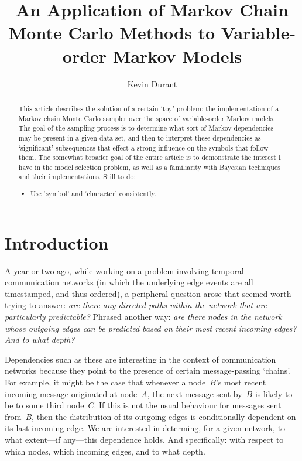 \documentclass[12pt,a4paper]{article}
\title{An Application of Markov Chain Monte Carlo Methods to Variable-order
  Markov Models}
\author{Kevin Durant}
\date{}
\begin{document}
\maketitle

\begin{abstract}
This article describes the solution of a certain `toy' problem: the
implementation of a Markov chain Monte Carlo sampler over the space of
variable-order Markov models. The goal of the sampling process is to determine
what sort of Markov dependencies may be present in a given data set, and then to
interpret these dependencies as `significant' subsequences that effect a strong
influence on the symbols that follow them. The somewhat broader goal of the
entire article is to demonstrate the interest I have in the model selection
problem, as well as a familiarity with Bayesian techniques and their
implementations. Still to do:
\begin{itemize}
  \item Use `symbol' and `character' consistently.
\end{itemize}
\end{abstract}

\section{Introduction} %

A year or two ago, while working on a problem involving temporal communication
networks (in which the underlying edge events are all timestamped, and thus
ordered), a peripheral question arose that seemed worth trying to answer:
\textit{are there any directed paths within the network that are particularly
predictable?} Phrased another way: \textit{are there nodes in the network whose
outgoing edges can be predicted based on their most recent incoming edges? And
to what depth?}

Dependencies such as these are interesting in the context of communication
networks because they point to the presence of certain message-passing `chains'.
For example, it might be the case that whenever a node~$B$'s most recent
incoming message originated at node~$A$, the next message sent by~$B$ is likely
to be to some third node~$C$. If this is not the usual behaviour for messages
sent from~$B$, then the distribution of its outgoing edges is conditionally
dependent on its last incoming edge. We are interested in determing, for a given
network, to what extent---if any---this dependence holds. And specifically: with
respect to which nodes, which incoming edges, and to what depth.
\end{document}
